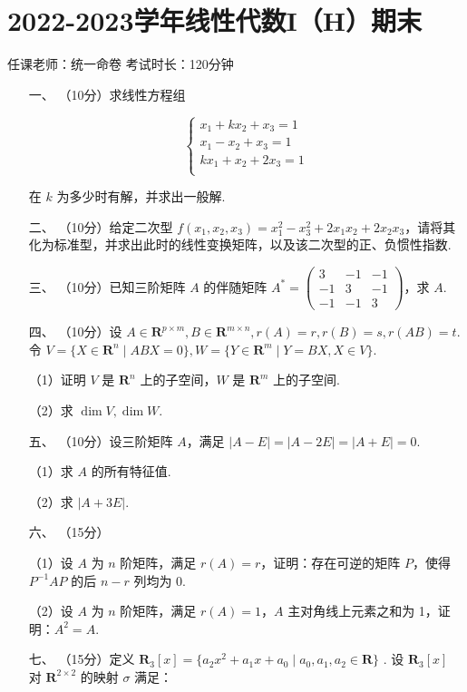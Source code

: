 \section*{2022-2023学年线性代数I（H）期末}

\begin{center}
    任课老师：统一命卷\hspace{4em} 考试时长：120分钟
\end{center}

\begin{enumerate}
	\item[一、]（10分）求线性方程组

	\[\left\{\begin{matrix}
	  x_1+kx_2+x_3= 1\\
	  x_1-x_2+x_3= 1 \\
	  kx_1+x_2+2x_3= 1 \\
	\end{matrix}\right.\]

	在 $k$ 为多少时有解，并求出一般解.
	\item[二、]（10分）给定二次型 $f(x_1,x_2,x_3)=x_1^2-x_3^2+2x_1x_2+2x_2x_3$，请将其化为标准型，并求出此时的线性变换矩阵，以及该二次型的正、负惯性指数.
	\item[三、] （10分）已知三阶矩阵 $A$ 的伴随矩阵 $A^*=\begin{pmatrix}
		3 & -1 &- 1\\
		-1 & 3 & -1\\
		-1 & -1 & 3
	  \end{pmatrix} $，求 $A$.
	\item[四、]（10分）设 $A\in \mathbf R^{p\times m},B\in \mathbf R^{m\times n},r(A)=r,r(B)=s,r(AB)=t$. 令 $V=\{X\in \mathbf R^n\mid ABX=0\},W=\{Y\in \mathbf R^m\mid Y=BX,X\in V\}$.

	（1）证明 $V$ 是 $\mathbf R^n$ 上的子空间，$W$ 是 $\mathbf R^m$ 上的子空间.

	（2）求 $\dim V,\dim W$.
	\item[五、]（10分）设三阶矩阵 $A$，满足 $|A-E|=|A-2E|=|A+E|=0$.

	（1）求 $A$ 的所有特征值.

	（2）求 $|A+3E|$.
	\item[六、]（15分）

	（1）设 $A$ 为 $n$ 阶矩阵，满足 $r(A)=r$，证明：存在可逆的矩阵 $P$，使得 $P^{-1}AP$ 的后 $n-r$ 列均为 0.

	（2）设 $A$ 为 $n$ 阶矩阵，满足 $r(A)=1$，$A$ 主对角线上元素之和为 1，证明：$A^2=A$.
	\item[七、]（15分）定义 $\mathbf R_3[x]=\{a_2x^2+a_1x+a_0\mid a_0,a_1,a_2\in \mathbf R\}$ . 设 $\mathbf R_3[x]$ 对 $\mathbf R^{2\times 2}$ 的映射 $\sigma$ 满足：


\end{enumerate}

